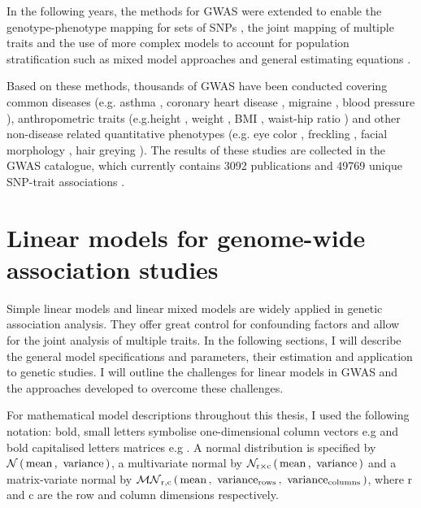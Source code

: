 In the following years, the methods for GWAS were extended to enable the genotype-phenotype mapping for sets of SNPs \citep{Wu2010,Casale2015}, the joint mapping of multiple traits \citep{Korte2012,Yang2011,Bottolo2013,Casale2015} and the use of more complex models to account for population stratification such as mixed model approaches \citep{Kang2010,Lippert2011,Zhang2010,Svishcheva2012} and general estimating equations \citep{Cupples2007}.

Based on these methods, thousands of GWAS have been conducted covering common diseases (e.g. asthma \citep{Noguchi2011,Pickrell2016}, coronary heart disease \citep{Wild2011,Takeuchi2012,Lu2012}, migraine \citep{Pickrell2016,Gormley2016}, blood pressure \citep{Kato2011,Franceschini2013}), anthropometric traits (e.g.height \citep{Lango2010,Wood2014}, weight \citep{Willer2009}, BMI \citep{Speliotes2010,Yang2012a}, waist-hip ratio \citep{Lindgren2009,Heid2010}) and other non-disease related quantitative phenotypes (e.g. eye color \citep{Eriksson2010,Candille2012,Zhang2013}, freckling \citep{Sulem2008}, facial morphology \citep{Paternoster2012}, hair greying \citep{Adhikari2016}). The results of these studies are collected in the GWAS catalogue, which currently contains \num{3092} publications and \num{49769} unique SNP-trait associations \citep[accessed 10.09.2017]{MacArthur2017}. 


\section{Linear models for genome-wide association studies}
\label{section:LinearModels}
Simple linear models and linear mixed models are widely applied in genetic association analysis. They offer great control for confounding factors and allow for the joint analysis of multiple traits. In the following sections, I will describe the general model specifications and parameters, their estimation and application to genetic studies. I will outline the challenges for linear models in GWAS and the approaches developed to overcome these challenges. 

For mathematical model descriptions throughout this thesis, I used the following notation: bold, small letters symbolise one-dimensional column vectors e.g  and bold capitalised letters matrices e.g . A normal distribution is specified by \(\mathcal{N}\left(\,{\text{mean}}\,,~{\text{variance}}\,\right)\), a multivariate normal by \(\mathcal{N}_{\text{r}\times \text{c}}\left(\, {\text{mean}} \,,~{\text{variance}} \,\right)\) and a matrix-variate normal by  \(\mathcal{MN}_{\text{r},\text{c}}\left(\, \boldsymbol{\mathbf{{\text{mean}}}} \,,~\boldsymbol{\mathbf{{\text{variance}_\text{rows}}}}\,,~\boldsymbol{\mathbf{{\text{variance}_{\text{columns}}}}} \,\right)\), where r and c are the row and column dimensions respectively.

